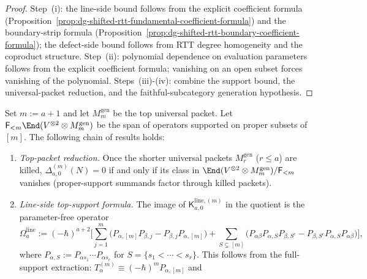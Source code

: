 \begin{proof}
Step~\textup{(i)}: the line-side bound follows from the explicit
coefficient formula
(Proposition~\ref{prop:dg-shifted-rtt-fundamental-coefficient-formula})
and the boundary-strip formula
(Proposition~\ref{prop:dg-shifted-rtt-boundary-coefficient-formula});
the defect-side bound follows from RTT degree homogeneity and the
coproduct structure.
Step~\textup{(ii)}: polynomial dependence on evaluation parameters
follows from the explicit coefficient formula; vanishing on an open
subset forces vanishing of the polynomial.
Steps~\textup{(iii)}-\textup{(iv)}: combine the support bound, the
universal-packet reduction, and the faithful-subcategory generation
hypothesis.
\end{proof}

\begin{proposition}
\label{prop:dg-shifted-rtt-top-packet-induction}
\label{prop:dg-shifted-rtt-top-packet-line-formula}
\label{prop:dg-shifted-rtt-top-packet-comparison}
\label{prop:dg-shifted-rtt-top-packet-standard-discharge}
\label{prop:dg-shifted-rtt-top-packet-conditional-closure}
\label{prop:dg-shifted-rtt-universal-evaluation-rigidity}
\label{prop:dg-shifted-rtt-top-packet-from-one-factor}
Set $m:=a+1$ and let $M_m^{\mathrm{gen}}$ be the top universal packet.
Let $\mathsf{F}_{<m}\End(V^{\otimes 2}\otimes M_m^{\mathrm{gen}})$ be
the span of operators supported on proper subsets of $[m]$.
The following chain of results holds:
\begin{enumerate}[label=\textup{(\roman*)}]
\item \emph{Top-packet reduction.}
 Once the shorter universal packets $M_r^{\mathrm{gen}}$ ($r\le a$)
 are killed, $\Delta^{(m)}_{a,0}(N)=0$ if and only if its class in
 $\End(V^{\otimes 2}\otimes M_m^{\mathrm{gen}})/\mathsf{F}_{<m}$
 vanishes (proper-support summands factor through killed packets).
\item \emph{Line-side top-support formula.}
 The image of $\mathsf{K}^{\mathrm{line},(m)}_{a,0}$ in the quotient
 is the parameter-free operator
 \[
 \Omega_a^{\mathrm{line}}
 :=
 (-\hbar)^{a+2}
 \biggl[
 \sum_{j=1}^{m}
 \bigl(P_{\alpha,[m]}P_{\beta,j}-P_{\beta,j}P_{\alpha,[m]}\bigr)
 +\!\!\sum_{S\subsetneq [m]}\!\!
 \bigl(P_{\alpha\beta}P_{\alpha,S}P_{\beta,S^c}
 -P_{\beta,S^c}P_{\alpha,S}P_{\alpha\beta}\bigr)
 \biggr],
 \]
 where $P_{\alpha,S}:=P_{\alpha s_1}\cdots P_{\alpha s_r}$ for
 $S=\{s_1<\cdots<s_r\}$. This follows from the full-support extraction:
 $T_\alpha^{(m)}\equiv(-\hbar)^m P_{\alpha,[m]}$ and

\end{enumerate}
\end{proposition}
